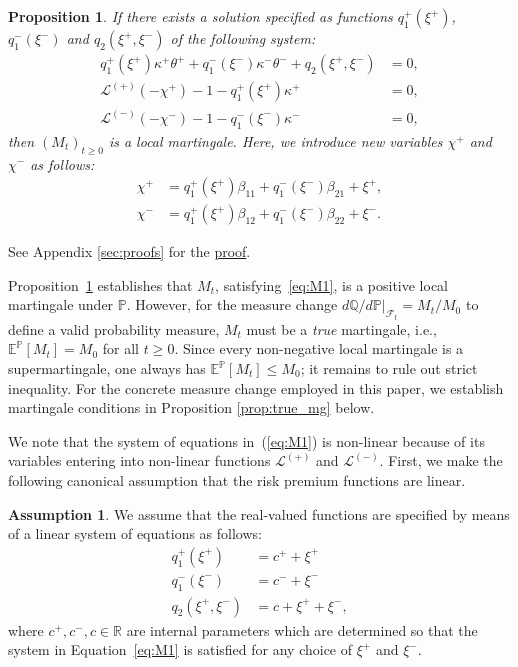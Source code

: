 \documentclass[11pt,a4paper]{article}
\numberwithin{equation}{section}
\newtheorem{proposition}[theorem]{Proposition}
\theoremstyle{remark}
\theoremstyle{definition}
\newtheorem{assumption}{Assumption}[section]
\begin{document}
\begin{proposition}\label{prop:martingaleConditions}
If there exists a solution specified as functions $q_1^+(\xi^+)$,  $q_1^-(\xi^-)$ and $q_2(\xi^+, \xi^-)$ of the following system:
\begin{equation}\label{eq:M1}
\begin{split}
        q_1^+(\xi^+)\kappa^+\theta^+ +q_1^-(\xi^-)\kappa^-\theta^-+q_2(\xi^+, \xi^-) &=0,\\
        \mathcal L^{(+)}(-\chi^+)-1-q_1^+(\xi^+)\kappa^+ &=0,\\
        \mathcal L^{(-)} (-\chi^-)-1-q_1^-(\xi^-)\kappa^-&=0,
  \end{split}
\end{equation}
then $(M_t)_{t\geq 0}$ is a local martingale. Here, we introduce new variables $\chi^+$ and $\chi^-$ as follows:
\begin{equation}\label{eq:chi}
\begin{split}
\chi^+ & = q_1^+(\xi^+)\beta_{11} + q_1^-(\xi^-)\beta_{21}+\xi^+,\\
\chi^- & = q_1^+(\xi^+)\beta_{12} + q_1^-(\xi^-)\beta_{22}+\xi^-.
  \end{split}
\end{equation}
\end{proposition}
See Appendix \ref{sec:proofs} for the \hyperref[proof:prop:martingaleConditions]{proof}.

Proposition~\ref{prop:martingaleConditions} establishes that $M_t$, satisfying~\eqref{eq:M1}, is a positive local martingale under $\mathbb{P}$.
However, for the measure change $d\mathbb{Q}/d\mathbb{P}|_{\mathcal{F}_t} = M_t/M_0$
to define a valid probability measure, $M_t$ must be a \emph{true} martingale,
i.e., $\mathbb{E}^{\mathbb{P}}[M_t] = M_0$ for all $t \geq 0$. Since every
non-negative local martingale is a supermartingale, one always has
$\mathbb{E}^{\mathbb{P}}[M_t] \leq M_0$; it remains to rule out strict inequality.
For the concrete measure change employed in this paper, we establish martingale conditions in Proposition \ref{prop:true_mg} below.

We note that the system of equations in~(\ref{eq:M1}) is non-linear because of its variables entering into non-linear functions $\mathcal L^{(+)}$ and $\mathcal L^{(-)}$. First, we make the following canonical assumption that the risk premium functions are linear.
\begin{assumption}
We assume that the real-valued functions are specified by means of a linear system of equations as follows:
\begin{equation}\label{eq:c}
\begin{split}
    q_1^+(\xi^+)      &= c^++\xi^+\\
    q_1^-(\xi^-)      &= c^-+\xi^-\\
    q_2(\xi^+, \xi^-) &= c+\xi^++\xi^-,
  \end{split}
\end{equation}
where $c^+, c^-, c \in \mathbb{R}$ are internal parameters which are determined so that the system in Equation~\eqref{eq:M1} is satisfied for any choice of $\xi^+$ and $\xi^-$.
\end{assumption}
\end{document}
